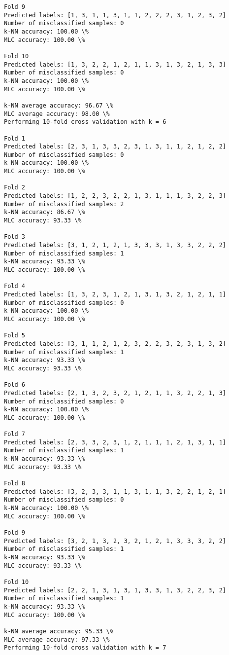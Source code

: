 \documentclass[11pt]{article}
\begin{document}
\begin{Verbatim}[commandchars=\\\{\}]
Fold 9
Predicted labels: [1, 3, 1, 1, 3, 1, 1, 2, 2, 2, 3, 1, 2, 3, 2]
Number of misclassified samples: 0
k-NN accuracy: 100.00 \%
MLC accuracy: 100.00 \%

Fold 10
Predicted labels: [1, 3, 2, 2, 1, 2, 1, 1, 3, 1, 3, 2, 1, 3, 3]
Number of misclassified samples: 0
k-NN accuracy: 100.00 \%
MLC accuracy: 100.00 \%

k-NN average accuracy: 96.67 \%
MLC average accuracy: 98.00 \%
Performing 10-fold cross validation with k = 6

Fold 1
Predicted labels: [2, 3, 1, 3, 3, 2, 3, 1, 3, 1, 1, 2, 1, 2, 2]
Number of misclassified samples: 0
k-NN accuracy: 100.00 \%
MLC accuracy: 100.00 \%

Fold 2
Predicted labels: [1, 2, 2, 3, 2, 2, 1, 3, 1, 1, 1, 3, 2, 2, 3]
Number of misclassified samples: 2
k-NN accuracy: 86.67 \%
MLC accuracy: 93.33 \%

Fold 3
Predicted labels: [3, 1, 2, 1, 2, 1, 3, 3, 3, 1, 3, 3, 2, 2, 2]
Number of misclassified samples: 1
k-NN accuracy: 93.33 \%
MLC accuracy: 100.00 \%

Fold 4
Predicted labels: [1, 3, 2, 3, 1, 2, 1, 3, 1, 3, 2, 1, 2, 1, 1]
Number of misclassified samples: 0
k-NN accuracy: 100.00 \%
MLC accuracy: 100.00 \%

Fold 5
Predicted labels: [3, 1, 1, 2, 1, 2, 3, 2, 2, 3, 2, 3, 1, 3, 2]
Number of misclassified samples: 1
k-NN accuracy: 93.33 \%
MLC accuracy: 93.33 \%

Fold 6
Predicted labels: [2, 1, 3, 2, 3, 2, 1, 2, 1, 1, 3, 2, 2, 1, 3]
Number of misclassified samples: 0
k-NN accuracy: 100.00 \%
MLC accuracy: 100.00 \%

Fold 7
Predicted labels: [2, 3, 3, 2, 3, 1, 2, 1, 1, 1, 2, 1, 3, 1, 1]
Number of misclassified samples: 1
k-NN accuracy: 93.33 \%
MLC accuracy: 93.33 \%

Fold 8
Predicted labels: [3, 2, 3, 3, 1, 1, 3, 1, 1, 3, 2, 2, 1, 2, 1]
Number of misclassified samples: 0
k-NN accuracy: 100.00 \%
MLC accuracy: 100.00 \%

Fold 9
Predicted labels: [3, 2, 1, 3, 2, 3, 2, 1, 2, 1, 3, 3, 3, 2, 2]
Number of misclassified samples: 1
k-NN accuracy: 93.33 \%
MLC accuracy: 93.33 \%

Fold 10
Predicted labels: [2, 2, 1, 3, 1, 3, 1, 3, 3, 1, 3, 2, 2, 3, 2]
Number of misclassified samples: 1
k-NN accuracy: 93.33 \%
MLC accuracy: 100.00 \%

k-NN average accuracy: 95.33 \%
MLC average accuracy: 97.33 \%
Performing 10-fold cross validation with k = 7


\end{Verbatim}
\end{document}
